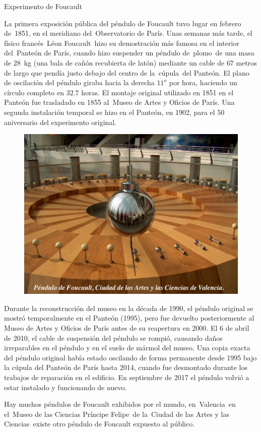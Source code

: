 \newpage %

\begin{myblock}{Experimento de Foucault}

\vspace{2mm} La primera exposición pública del péndulo de Foucault tuvo lugar en febrero de 1851, en el meridiano del Observatorio de París. Unas semanas más tarde, el físico francés Léon Foucault hizo su demostración más famosa en el interior del Panteón de París, cuando hizo suspender un péndulo de plomo de una masa de $28$ kg (una bala de cañón recubierta de latón) mediante un cable de $67$ metros de largo que pendía justo debajo del centro de la cúpula del Panteón. El plano de oscilación del péndulo giraba hacia la derecha $11^o$ por hora, haciendo un círculo completo en $32.7$ horas. El montaje original utilizado en 1851 en el Panteón fue trasladado en 1855 al Museo de Artes y Oficios de París. Una segunda instalación temporal se hizo en el Panteón, en 1902, para el 50 aniversario del experimento original.

\begin{figure}[H]
	\centering
	\includegraphics[width=.9\textwidth]{imagenes/imagenes11/T11IM12.png}
\end{figure}

\vspace{2mm} Durante la reconstrucción del museo en la década de 1990, el péndulo original se mostró temporalmente en el Panteón (1995), pero fue devuelto posteriormente al Museo de Artes y Oficios de París antes de su reapertura en 2000. El 6 de abril de 2010, el cable de suspensión del péndulo se rompió, causando daños irreparables en el péndulo y en el suelo de mármol del museo. Una copia exacta del péndulo original había estado oscilando de forma permanente desde 1995 bajo la cúpula del Panteón de París hasta 2014, cuando fue desmontado durante los trabajos de reparación en el edificio. En septiembre de 2017 el péndulo volvió a estar instalado y funcionando de nuevo.

\vspace{2mm} Hay muchos péndulos de Foucault exhibidos por el mundo, en Valencia en el Museo de las Ciencias Príncipe Felipe de la Ciudad de las Artes y las Ciencias existe otro péndulo de Foucault expuesto al público.	
\end{myblock}







